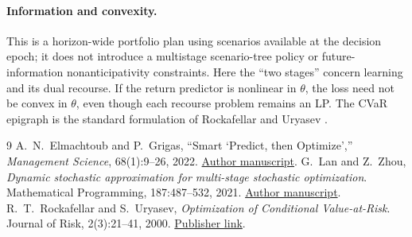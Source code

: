 \documentclass[11pt]{article}
\theoremstyle{definition}
\begin{document}
\paragraph{Information and convexity.}
This is a horizon-wide portfolio plan using scenarios available at the decision epoch; it does not introduce a multistage scenario-tree policy or future-information nonanticipativity constraints. Here the ``two stages'' concern learning and its dual recourse. If the return predictor is nonlinear in $\theta$, the loss need not be convex in $\theta$, even though each recourse problem remains an LP. The CVaR epigraph is the standard formulation of Rockafellar and Uryasev \cite{cvar2000}.

\begin{thebibliography}{9}
    A.~N.~Elmachtoub and P.~Grigas,
    ``Smart `Predict, then Optimize',''
    \textit{Management Science}, 68(1):9--26, 2022. \href{https://arxiv.org/abs/1710.08005}{Author manuscript}.
    G.~Lan and Z.~Zhou,
    \textit{Dynamic stochastic approximation for multi-stage stochastic optimization}.
    Mathematical Programming, 187:487--532, 2021.
    \href{https://arxiv.org/abs/1707.03324}{Author manuscript}.
    R.~T.~Rockafellar and S.~Uryasev,
    \textit{Optimization of Conditional Value-at-Risk}.
    Journal of Risk, 2(3):21--41, 2000.
    \href{https://doi.org/10.21314/JOR.2000.038}{Publisher link}.
\end{thebibliography}
\end{document}

